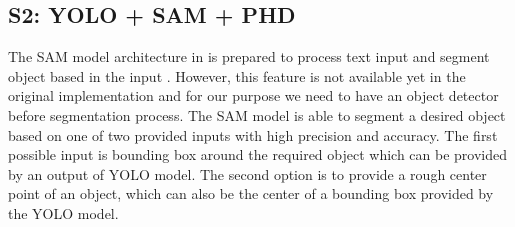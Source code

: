 \subsection{S2: YOLO + SAM + PHD}
The SAM model architecture in \cite{SAM2023} is prepared to process text input and segment object based in the input
. However, this feature is not available yet in the original implementation and for our purpose we need to have an
object
detector before segmentation process. The SAM model is able to segment a desired object based on one of two provided
inputs with high precision and accuracy. The first possible input is bounding box around the required object which
can be provided by an output of YOLO model. The second option is to provide a rough center point of an object, which
can also be the center of a bounding box provided by the YOLO model.


